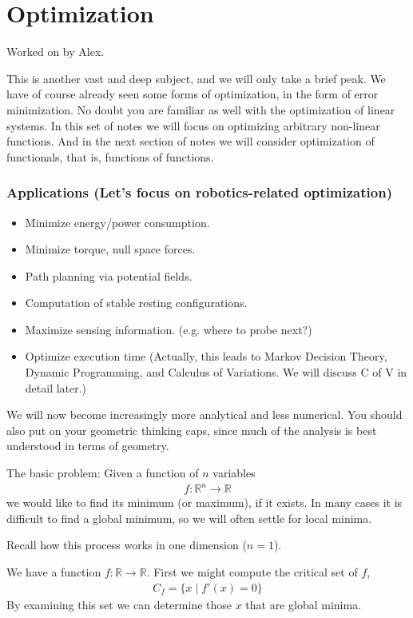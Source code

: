 \chapter{Optimization}

Worked on by Alex.

This is another vast and deep subject, and we will only take a brief peak.
We have of course already seen some forms of optimization, in the form of error minimization.
No doubt you are familiar as well with the optimization of linear systems.
In this set of notes we will focus on optimizing arbitrary non-linear functions.
And in the next section of notes we will consider optimization of functionals, that is, functions of functions.

\subsection*{Applications (Let's focus on robotics-related optimization)}

\begin{itemize}
  \item Minimize energy/power consumption.
  \item Minimize torque, null space forces.
  \item Path planning via potential fields.
  \item Computation of stable resting configurations.
  \item Maximize sensing information. (e.g. where to probe next?)
  \item Optimize execution time (Actually, this leads to Markov Decision Theory, Dynamic Programming, and Calculus of Variations. We will discuss C of V in detail later.)
\end{itemize}

We will now become increasingly more analytical and less numerical.
You should also put on your geometric thinking caps, since much of the analysis is best understood in terms of geometry.

The basic problem: Given a function of $n$ variables
\begin{align}
  f: \mathbb{R}^n \rightarrow \mathbb{R}
\end{align}
we would like to find its minimum (or maximum), if it exists.
In many cases it is difficult to find a global minimum, so we will often settle for local minima.

Recall how this process works in one dimension ($n = 1$).

We have a function $f: \mathbb{R} \rightarrow \mathbb{R}$. First we might compute the critical set of $f$,
\begin{align}
  C_f = \{ x \mid f'(x) = 0 \}
\end{align}
By examining this set we can determine those $x$ that are global minima.

